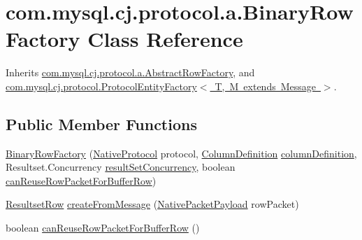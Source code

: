 \hypertarget{classcom_1_1mysql_1_1cj_1_1protocol_1_1a_1_1_binary_row_factory}{}\section{com.\+mysql.\+cj.\+protocol.\+a.\+Binary\+Row\+Factory Class Reference}
\label{classcom_1_1mysql_1_1cj_1_1protocol_1_1a_1_1_binary_row_factory}


Inherits \mbox{\hyperlink{classcom_1_1mysql_1_1cj_1_1protocol_1_1a_1_1_abstract_row_factory}{com.\+mysql.\+cj.\+protocol.\+a.\+Abstract\+Row\+Factory}}, and \mbox{\hyperlink{interfacecom_1_1mysql_1_1cj_1_1protocol_1_1_protocol_entity_factory}{com.\+mysql.\+cj.\+protocol.\+Protocol\+Entity\+Factory$<$ T, M extends Message $>$}}.

\subsection*{Public Member Functions}
\begin{DoxyCompactItemize}
\item 
\mbox{\hyperlink{classcom_1_1mysql_1_1cj_1_1protocol_1_1a_1_1_binary_row_factory_a5a203b6e4cd92e3ac271a55815a4d3b5}{Binary\+Row\+Factory}} (\mbox{\hyperlink{classcom_1_1mysql_1_1cj_1_1protocol_1_1a_1_1_native_protocol}{Native\+Protocol}} protocol, \mbox{\hyperlink{interfacecom_1_1mysql_1_1cj_1_1protocol_1_1_column_definition}{Column\+Definition}} \mbox{\hyperlink{classcom_1_1mysql_1_1cj_1_1protocol_1_1a_1_1_abstract_row_factory_a7aef40ef79169af177fd41fe37bc4dec}{column\+Definition}}, Resultset.\+Concurrency \mbox{\hyperlink{classcom_1_1mysql_1_1cj_1_1protocol_1_1a_1_1_abstract_row_factory_ac68967cbb94b27d270217cdd4dec3203}{result\+Set\+Concurrency}}, boolean \mbox{\hyperlink{classcom_1_1mysql_1_1cj_1_1protocol_1_1a_1_1_binary_row_factory_a01899a9aa9f25f09a64fe8b3d43379f8}{can\+Reuse\+Row\+Packet\+For\+Buffer\+Row}})
\item 
\mbox{\hyperlink{interfacecom_1_1mysql_1_1cj_1_1protocol_1_1_resultset_row}{Resultset\+Row}} \mbox{\hyperlink{classcom_1_1mysql_1_1cj_1_1protocol_1_1a_1_1_binary_row_factory_a02bc6bd4142c4797180e402e70065e7e}{create\+From\+Message}} (\mbox{\hyperlink{classcom_1_1mysql_1_1cj_1_1protocol_1_1a_1_1_native_packet_payload}{Native\+Packet\+Payload}} row\+Packet)
\item 
boolean \mbox{\hyperlink{classcom_1_1mysql_1_1cj_1_1protocol_1_1a_1_1_binary_row_factory_a01899a9aa9f25f09a64fe8b3d43379f8}{can\+Reuse\+Row\+Packet\+For\+Buffer\+Row}} ()
\end{DoxyCompactItemize}
